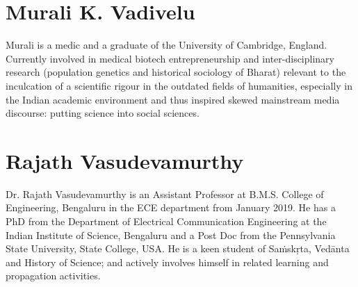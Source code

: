 \section*{Murali K. Vadivelu}

Murali is a medic and a graduate of the University of Cambridge, England. Currently involved in medical biotech entrepreneurship and inter-disciplinary research (population genetics and historical sociology of Bharat) relevant to the inculcation of a scientific rigour in the outdated fields of humanities, especially in the Indian academic environment and thus inspired skewed mainstream media discourse: putting science into social sciences.


\section*{Rajath Vasudevamurthy}

Dr. Rajath Vasudevamurthy is an Assistant Professor at B.M.S. College of Engineering, Bengaluru in the ECE department from January 2019. He has a PhD from the Department of Electrical Communication Engineering at the Indian Institute of Science, Bengaluru and a Post Doc from the Pennsylvania State University, State College, USA. He is a keen student of Saṁskṛta, Vedānta and History of Science; and actively involves himself in related learning and propagation activities.

